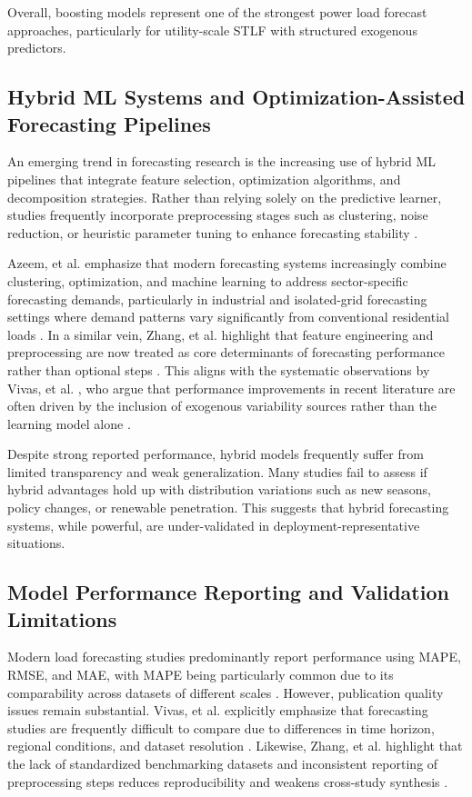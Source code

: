 \documentclass[conference]{IEEEtran}
\begin{document}
Overall, boosting models represent one of the strongest power load forecast approaches, particularly for utility-scale STLF with structured exogenous predictors.

\subsection{Hybrid ML Systems and Optimization-Assisted Forecasting Pipelines}

An emerging trend in forecasting research is the increasing use of hybrid ML pipelines that integrate feature selection, optimization algorithms, and decomposition strategies. Rather than relying solely on the predictive learner, studies frequently incorporate preprocessing stages such as clustering, noise reduction, or heuristic parameter tuning to enhance forecasting stability \cite{vivas2020,azeem2021}.

Azeem, et al. \cite{azeem2021} emphasize that modern forecasting systems increasingly combine clustering, optimization, and machine learning to address sector-specific forecasting demands, particularly in industrial and isolated-grid forecasting settings where demand patterns vary significantly from conventional residential loads \cite{azeem2021}. In a similar vein, Zhang, et al. \cite{zhang2021} highlight that feature engineering and preprocessing are now treated as core determinants of forecasting performance rather than optional steps \cite{zhang2021}. This aligns with the systematic observations by Vivas, et al. \cite{vivas2020}, who argue that performance improvements in recent literature are often driven by the inclusion of exogenous variability sources rather than the learning model alone \cite{vivas2020}.

Despite strong reported performance, hybrid models frequently suffer from limited transparency and weak generalization. Many studies fail to assess if hybrid advantages hold up with distribution variations such as new seasons, policy changes, or renewable penetration. This suggests that hybrid forecasting systems, while powerful, are under-validated in deployment-representative situations.

\subsection{Model Performance Reporting and Validation Limitations}

Modern load forecasting studies predominantly report performance using MAPE, RMSE, and MAE, with MAPE being particularly common due to its comparability across datasets of different scales \cite{vivas2020}. However, publication quality issues remain substantial. Vivas, et al. \cite{vivas2020} explicitly emphasize that forecasting studies are frequently difficult to compare due to differences in time horizon, regional conditions, and dataset resolution \cite{vivas2020}. Likewise, Zhang, et al. \cite{zhang2021} highlight that the lack of standardized benchmarking datasets and inconsistent reporting of preprocessing steps reduces reproducibility and weakens cross-study synthesis \cite{zhang2021}.
\end{document}
